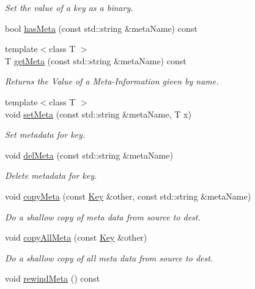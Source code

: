 \begin{DoxyCompactItemize}
\begin{DoxyCompactList}\small\item\em Set the value of a key as a binary. \end{DoxyCompactList}\item 
bool \hyperlink{classkdb_1_1Key_abb2c472e514ecef5fedb63ecae7c0f54}{has\+Meta} (const std\+::string \&meta\+Name) const 
\item 
{\footnotesize template$<$class T $>$ }\\T \hyperlink{classkdb_1_1Key_a36e21abc1a5b8c3a8d3ee39f8f8b91fa}{get\+Meta} (const std\+::string \&meta\+Name) const 
\begin{DoxyCompactList}\small\item\em Returns the Value of a Meta-\/\+Information given by name. \end{DoxyCompactList}\item 
{\footnotesize template$<$class T $>$ }\\void \hyperlink{classkdb_1_1Key_a4c5a3d463127ade0b766c4298002daa3}{set\+Meta} (const std\+::string \&meta\+Name, T x)
\begin{DoxyCompactList}\small\item\em Set metadata for key. \end{DoxyCompactList}\item 
void \hyperlink{classkdb_1_1Key_a2305da805095605aca38d53f2733fb57}{del\+Meta} (const std\+::string \&meta\+Name)
\begin{DoxyCompactList}\small\item\em Delete metadata for key. \end{DoxyCompactList}\item 
void \hyperlink{classkdb_1_1Key_a53f6d2196a7f17c4bdc544207bdc5f4c}{copy\+Meta} (const \hyperlink{classkdb_1_1Key}{Key} \&other, const std\+::string \&meta\+Name)
\begin{DoxyCompactList}\small\item\em Do a shallow copy of meta data from source to dest. \end{DoxyCompactList}\item 
void \hyperlink{classkdb_1_1Key_aec0910bf293db33deac6a3f81359cb48}{copy\+All\+Meta} (const \hyperlink{classkdb_1_1Key}{Key} \&other)
\begin{DoxyCompactList}\small\item\em Do a shallow copy of all meta data from source to dest. \end{DoxyCompactList}\item 
void \hyperlink{classkdb_1_1Key_adf6171b76e01c2b84c6050d43673dd97}{rewind\+Meta} () const 

\end{DoxyCompactItemize}
